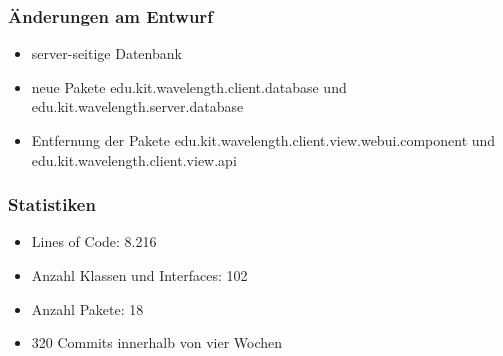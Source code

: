\documentclass[10pt]{beamer}
\begin{document}
\begin{frame}
\frametitle{Änderungen am Entwurf}
\begin{itemize}
\item server-seitige Datenbank
\item neue Pakete \alert{edu.kit.wavelength.client.database} und \alert{edu.kit.wavelength.server.database}
\item Entfernung der Pakete \alert{edu.kit.wavelength.client.view.webui.component} und \alert{edu.kit.wavelength.client.view.api}
\end{itemize}
\end{frame}

\begin{frame}
\frametitle{Statistiken}
\begin{itemize}
\item Lines of Code: 8.216
\item Anzahl Klassen und Interfaces: 102
\item Anzahl Pakete: 18
\item 320 Commits innerhalb von vier Wochen
\end{itemize}
\end{frame}
\end{document}
